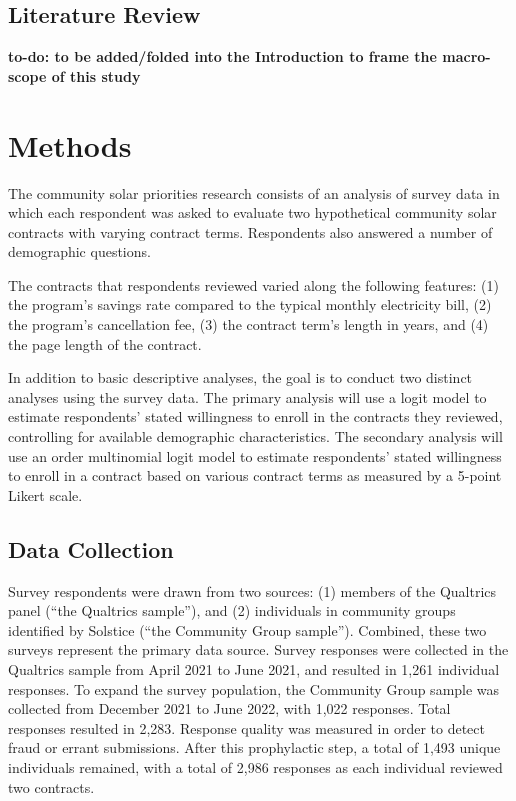 \documentclass[
]{article}
\begin{document}
\hypertarget{literature-review}{%
\subsection{Literature Review}\label{literature-review}}

\textbf{to-do: to be added/folded into the Introduction to frame the
macro-scope of this study}

\hypertarget{methods}{%
\section{Methods}\label{methods}}

The community solar priorities research consists of an analysis of
survey data in which each respondent was asked to evaluate two
hypothetical community solar contracts with varying contract terms.
Respondents also answered a number of demographic questions.

The contracts that respondents reviewed varied along the following
features: (1) the program's savings rate compared to the typical monthly
electricity bill, (2) the program's cancellation fee, (3) the contract
term's length in years, and (4) the page length of the contract.

In addition to basic descriptive analyses, the goal is to conduct two
distinct analyses using the survey data. The primary analysis will use a
logit model to estimate respondents' stated willingness to enroll in the
contracts they reviewed, controlling for available demographic
characteristics. The secondary analysis will use an order multinomial
logit model to estimate respondents' stated willingness to enroll in a
contract based on various contract terms as measured by a 5-point Likert
scale.

\hypertarget{data-collection}{%
\subsection{Data Collection}\label{data-collection}}

Survey respondents were drawn from two sources: (1) members of the
Qualtrics panel (``the Qualtrics sample''), and (2) individuals in
community groups identified by Solstice (``the Community Group
sample''). Combined, these two surveys represent the primary data
source. Survey responses were collected in the Qualtrics sample from
April 2021 to June 2021, and resulted in 1,261 individual responses. To
expand the survey population, the Community Group sample was collected
from December 2021 to June 2022, with 1,022 responses. Total responses
resulted in 2,283. Response quality was measured in order to detect
fraud or errant submissions. After this prophylactic step, a total of
1,493 unique individuals remained, with a total of 2,986 responses as
each individual reviewed two contracts.
\end{document}
